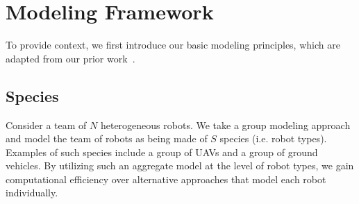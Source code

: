\documentclass[letterpaper, 10 pt, conference]{ieeeconf}  %
\newcommand{\blue}[1]{\color{blue} #1 \color{black}}
\begin{document}

\section{Modeling Framework}

To provide context, we first introduce our basic modeling principles, which are adapted from our prior work~\cite{ravichandar2020}. 

\subsection{Species}
Consider a team of $N$ heterogeneous robots. We take a group modeling approach~\cite{albrecht2018autonomous} and model the team of robots as being made of $S$ species (i.e. robot types). Examples of such species include a group of UAVs and a group of ground vehicles. By utilizing such an aggregate model at the level of robot types, we gain computational efficiency over alternative approaches that model each robot individually. 
\end{document}
